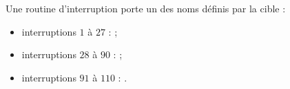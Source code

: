 Une routine d'interruption porte un des noms définis par la cible :
\begin{itemize}
  \item interruptions $1$ à $27$ :  ;
  \item interruptions $28$ à $90$ :  ;
  \item interruptions $91$ à $110$ : .
\end{itemize}






